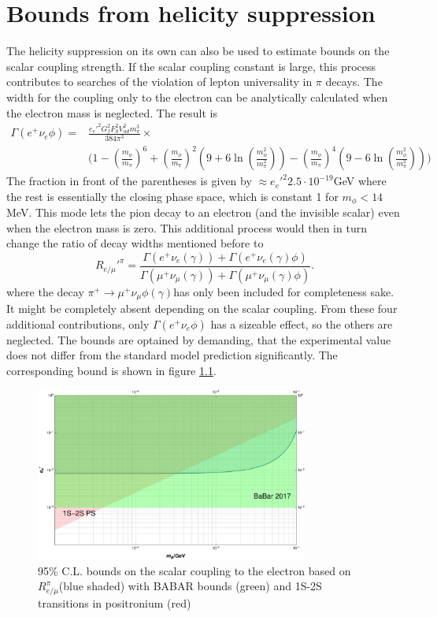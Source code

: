 \chapter{Bounds from helicity suppression}
\label{ch:chiSupp}
The helicity suppression on its own can also be used to estimate bounds on the scalar coupling strength.
If the scalar coupling constant is large, this process contributes to searches of the violation of lepton universality in $\pi$ decays.
The width for the coupling only to the electron can be analytically calculated when the electron mass is neglected. The result is
\begin{align*}
\Gamma(e^+\nu_e\phi) =& \frac{e_e'^2 G_f^2 F_0^2 V_{ud}^2 m_\pi^3}{384\pi^3}\times \\ &\Bigg(
1-\left(\frac{m_\phi}{m_\pi}\right)^6+\left(\frac{m_\phi}{m_\pi}\right)^2\left(9+6\ln\left(\frac{m_\phi^2}{m_\pi^2}\right)\right)-\left(\frac{m_\phi}{m_\pi}\right)^4\left(9-6\ln\left(\frac{m_\phi^2}{m_\pi^2}\right)\right)
\Bigg)
\end{align*}
The fraction in front of the parentheses is given by $\approx e_e'^2 2.5\cdot 10^{-19}$GeV where the rest is essentially the closing phase space, which is constant 1 for $m_\phi<14$ MeV. This mode lets the pion decay to an electron (and the invisible scalar) even when the electron mass is zero.
 This additional process would then in turn change the ratio of decay widths mentioned before to
\begin{equation}
R_{e/\mu}'^\pi=\frac{\Gamma(e^+ \nu_e(\gamma))+\Gamma(e^+ \nu_e(\gamma)\phi)}{\Gamma(\mu^+ \nu_\mu(\gamma))+\Gamma(\mu^+ \nu_\mu(\gamma)\phi)}.
\end{equation}
where the decay $\pi^+\rightarrow \mu^+ \nu_\mu \phi(\gamma)$has only been included for completeness sake. It might be completely absent depending on the scalar coupling.
From these four additional contributions, only $\Gamma(e^+\nu_e\phi)$ has a sizeable effect, so the others are neglected. The bounds are optained by demanding, that the experimental value does not differ from the standard model prediction significantly. The corresponding bound is shown in figure \ref{fg:PiSpectrumScalarUniversalityBounds}.
\begin{figure}[H]
  \centering
    \includegraphics[width=0.8\textwidth]{imgs/LeptonUniversality}
    \caption{95\% C.L. bounds on the scalar coupling to the electron based on $R^\pi_{e/\mu}$(blue shaded) with BABAR bounds (green) and 1S-2S transitions in positronium (red)}
    \label{fg:PiSpectrumScalarUniversalityBounds}
\end{figure}
